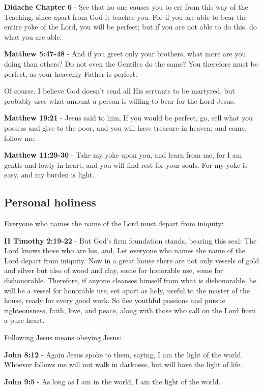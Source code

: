 \documentclass[11pt]{article}
\begin{document}
\textbf{Didache Chapter 6} - See that no one causes you to err from this way of the Teaching, since apart from God it teaches you. For if you are able to bear the entire yoke of the Lord, you will be perfect; but if you are not able to do this, do what you are able.

\textbf{Matthew 5:47-48} - And if you greet only your brothers, what more are you doing than others? Do not even the Gentiles do the same? You therefore must be perfect, as your heavenly Father is perfect.

Of course, I believe God doesn't send all His servants to be martyred, but probably uses what amount a person is willing to bear for the Lord Jesus.

\textbf{Matthew 19:21} - Jesus said to him, If you would be perfect, go, sell what you possess and give to the poor, and you will have treasure in heaven; and come, follow me.

\textbf{Matthew 11:29-30} - Take my yoke upon you, and learn from me, for I am gentle and lowly in heart, and you will find rest for your souls. For my yoke is easy, and my burden is light.

\subsection{Personal holiness}
\label{sec:orgf4b2020}
Everyone who names the name of the Lord must depart from iniquity:

\textbf{II Timothy 2:19-22} - But God's firm foundation stands, bearing this seal: The Lord knows those who are his, and, Let everyone who names the name of the Lord depart from iniquity. Now in a great house there are not only vessels of gold and silver but also of wood and clay, some for honorable use, some for dishonorable. Therefore, if anyone cleanses himself from what is dishonorable, he will be a vessel for honorable use, set apart as holy, useful to the master of the house, ready for every good work. So flee youthful passions and pursue righteousness, faith, love, and peace, along with those who call on the Lord from a pure heart.

Following Jesus means obeying Jesus:

\textbf{John 8:12} - Again Jesus spoke to them, saying, I am the light of the world. Whoever follows me will not walk in darkness, but will have the light of life.

\textbf{John 9:5} - As long as I am in the world, I am the light of the world.
\end{document}
